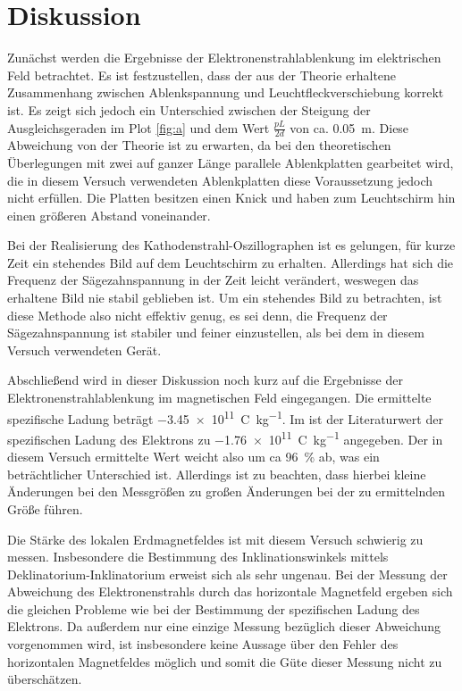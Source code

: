 
\section{Diskussion}
Zunächst werden die Ergebnisse der Elektronenstrahlablenkung im
elektrischen Feld betrachtet. Es ist festzustellen, dass der aus der
Theorie erhaltene Zusammenhang zwischen Ablenkspannung und
Leuchtfleckverschiebung korrekt ist. Es zeigt sich jedoch ein
Unterschied zwischen der Steigung der Ausgleichsgeraden im Plot
\ref{fig:a} und dem Wert $\frac{pL}{2d}$ von
ca. \SI{0.05}{\metre}. Diese Abweichung von der Theorie ist zu erwarten,
da bei den theoretischen Überlegungen mit zwei auf ganzer Länge
parallele Ablenkplatten gearbeitet wird, die in diesem Versuch
verwendeten Ablenkplatten diese Voraussetzung jedoch nicht erfüllen. Die
Platten besitzen einen Knick und haben zum Leuchtschirm hin einen
größeren Abstand voneinander.

Bei der Realisierung des Kathodenstrahl-Oszillographen ist es gelungen,
für kurze Zeit ein stehendes Bild auf dem Leuchtschirm zu
erhalten. Allerdings hat sich die Frequenz der Sägezahnspannung in der
Zeit leicht verändert, weswegen das erhaltene Bild nie stabil geblieben
ist. Um ein stehendes Bild zu betrachten, ist diese Methode also nicht
effektiv genug, es sei denn, die Frequenz der Sägezahnspannung ist
stabiler und feiner einzustellen, als bei dem in diesem Versuch
verwendeten Gerät.

Abschließend wird in dieser Diskussion noch kurz auf die Ergebnisse der
Elektronenstrahlablenkung im magnetischen Feld eingegangen. Die
ermittelte spezifische Ladung beträgt
\SI{-3.45e11}{\coulomb\per\kilo\gram}. Im \textcite{demtroeder-1}
ist der Literaturwert der spezifischen Ladung des Elektrons zu
\SI{-1.76e11}{\coulomb\per\kilo\gram} angegeben. Der in diesem Versuch
ermittelte Wert weicht also um ca \SI{96}{\percent} ab, was ein
beträchtlicher Unterschied ist. Allerdings ist zu beachten, dass hierbei
kleine Änderungen bei den Messgrößen zu großen Änderungen bei der zu
ermittelnden Größe führen.

Die Stärke des lokalen Erdmagnetfeldes ist mit diesem Versuch schwierig
zu messen. Insbesondere die Bestimmung des Inklinationswinkels mittels
Deklinatorium-Inklinatorium erweist sich als sehr ungenau. Bei der
Messung der Abweichung des Elektronenstrahls durch das horizontale
Magnetfeld ergeben sich die gleichen Probleme wie bei der Bestimmung der
spezifischen Ladung des Elektrons. Da außerdem nur eine einzige Messung
bezüglich dieser Abweichung vorgenommen wird, ist insbesondere keine
Aussage über den Fehler des horizontalen Magnetfeldes möglich und somit
die Güte dieser Messung nicht zu überschätzen.
